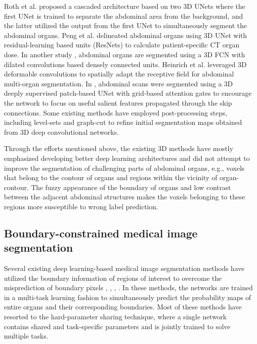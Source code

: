 \documentclass[final,5p,times,twocolumn]{elsarticle}
\begin{document}
Roth et al. \cite{Roth2018AnAO} proposed a cascaded architecture based on two 3D UNets where the first UNet is trained to separate the abdominal area from the background, and the latter utilized the output from the first UNet to simultaneously segment the abdominal organs. Peng et al. \cite{Peng2020AMO} delineated abdominal organs using 3D UNet with residual-learning based units (ResNets) to calculate patient-specific CT organ dose. In another study \cite{gibson2018automatic}, abdominal organs are segmented using a 3D FCN with dilated convolutions based densely connected units. Heinrich et al. \cite{heinrich2019obelisk} leveraged 3D deformable convolutions to spatially adapt the receptive field for abdominal multi-organ segmentation. In \cite{liu2020ct}, abdominal scans were segmented using a 3D deeply supervised patch-based UNet with grid-based attention gates to encourage the network to focus on useful salient features propagated through the skip connections. Some existing methods have employed post-processing steps, including level-sets \cite{hu2017automatic} and graph-cut \cite{article1kim} to refine initial segmentation maps obtained from 3D deep convolutional networks. 

Through the efforts mentioned above, the existing 3D methods have mostly emphasized developing better deep learning architectures and did not attempt to improve the segmentation of challenging parts of abdominal organs, e.g., voxels that belong to the contour of organs and regions within the vicinity of organ-contour. The fuzzy appearance of the boundary of organs and low contrast between the adjacent abdominal structures makes the voxels belonging to these regions more susceptible to wrong label prediction. 
\subsection{Boundary-constrained medical image segmentation}\label{sec:boundary}
Several existing deep learning-based medical image segmentation methods have utilized the boundary information of regions of interest to overcome the misprediction of boundary pixels \cite{chen2016dcan}, \cite{8363791}, \cite{8906008}, \cite{Lee_2020_CVPR}. In these methods, the networks are trained in a multi-task learning fashion to simultaneously predict the probability maps of entire organs and their corresponding boundaries. Most of these methods have resorted to the hard-parameter sharing technique, where a single network contains shared and task-specific parameters and is jointly trained to solve multiple tasks. 
\end{document}
